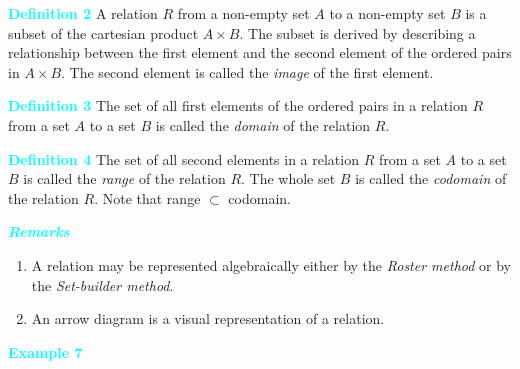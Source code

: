 \documentclass[11pt]{article}
\begin{document}
\vspace{0.8em}

\vspace{0.8em}

\noindent
\colorbox{ncertblue}{\textcolor{cyan}{\textbf{Definition 2}}}\hspace{0.5em}
A relation $R$ from a non-empty set $A$ to a non-empty set $B$ is a subset of
the cartesian product $A \times B$. The subset is derived by describing a
relationship between the first element and the second element of the ordered
pairs in $A \times B$. The second element is called the \textit{image} of the
first element.

\vspace{0.6em}
\noindent
\colorbox{ncertblue}{\textcolor{cyan}{\textbf{Definition 3}}}\hspace{0.5em}
The set of all first elements of the ordered pairs in a relation $R$ from a set
$A$ to a set $B$ is called the \textit{domain} of the relation $R$.

\vspace{0.6em}
\noindent
\colorbox{ncertblue}{\textcolor{cyan}{\textbf{Definition 4}}}\hspace{0.5em}
The set of all second elements in a relation $R$ from a set $A$ to a set $B$ is
called the \textit{range} of the relation $R$. The whole set $B$ is called the
\textit{codomain} of the relation $R$. Note that range $\subset$ codomain.

\vspace{0.6em}
\noindent
\colorbox{ncertblue}{\textcolor{cyan}{\textbf{\textit{Remarks}}}}

\begin{enumerate}
\item A relation may be represented algebraically either by the
\textit{Roster method} or by the \textit{Set-builder method}.
\item An arrow diagram is a visual representation of a relation.
\end{enumerate}

\noindent\textcolor{cyan}{\textbf{Example 7}}
\end{document}
